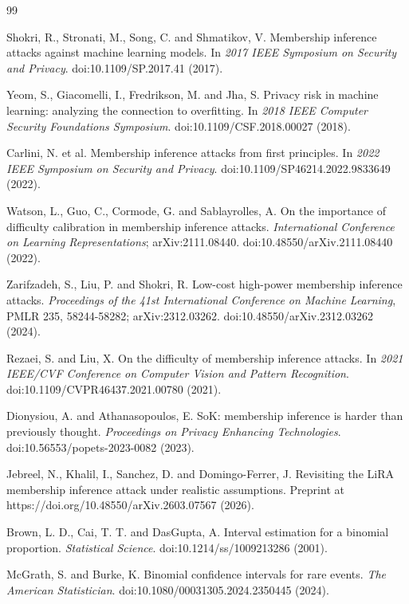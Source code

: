 \documentclass[
  10pt,
  twocolumn]{article}
\begin{document}
\begin{thebibliography}{99}

Shokri, R., Stronati, M., Song, C. and Shmatikov, V.
Membership inference attacks against machine learning models.
In \emph{2017 IEEE Symposium on Security and Privacy}.
doi:10.1109/SP.2017.41 (2017).

Yeom, S., Giacomelli, I., Fredrikson, M. and Jha, S.
Privacy risk in machine learning: analyzing the connection to overfitting.
In \emph{2018 IEEE Computer Security Foundations Symposium}.
doi:10.1109/CSF.2018.00027 (2018).

Carlini, N. et al.
Membership inference attacks from first principles.
In \emph{2022 IEEE Symposium on Security and Privacy}.
doi:10.1109/SP46214.2022.9833649 (2022).

Watson, L., Guo, C., Cormode, G. and Sablayrolles, A.
On the importance of difficulty calibration in membership inference attacks.
\emph{International Conference on Learning Representations}; arXiv:2111.08440.
doi:10.48550/arXiv.2111.08440 (2022).

Zarifzadeh, S., Liu, P. and Shokri, R.
Low-cost high-power membership inference attacks.
\emph{Proceedings of the 41st International Conference on Machine Learning}, PMLR 235, 58244-58282; arXiv:2312.03262.
doi:10.48550/arXiv.2312.03262 (2024).

Rezaei, S. and Liu, X.
On the difficulty of membership inference attacks.
In \emph{2021 IEEE/CVF Conference on Computer Vision and Pattern Recognition}.
doi:10.1109/CVPR46437.\allowbreak{}2021.00780 (2021).

Dionysiou, A. and Athanasopoulos, E.
SoK: membership inference is harder than previously thought.
\emph{Proceedings on Privacy Enhancing Technologies}.
doi:10.56553/popets-2023-0082 (2023).

Jebreel, N., Khalil, I., Sanchez, D. and Domingo-Ferrer, J.
Revisiting the LiRA membership inference attack under realistic assumptions.
Preprint at https://doi.org/10.48550/\allowbreak{}arXiv.2603.07567 (2026).

Brown, L. D., Cai, T. T. and DasGupta, A.
Interval estimation for a binomial proportion.
\emph{Statistical Science}.
doi:10.1214/ss/1009213286 (2001).

McGrath, S. and Burke, K.
Binomial confidence intervals for rare events.
\emph{The American Statistician}.
doi:10.1080/00031305.2024.2350445 (2024).


\end{thebibliography}
\end{document}
